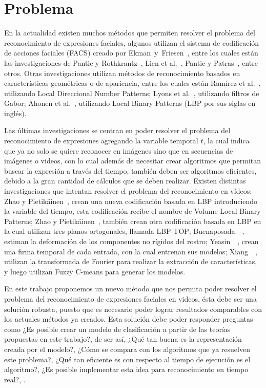 \section{Problema}
\label{sec:problema}

En la actualidad existen muchos métodos que permiten resolver el problema del reconocimiento de expresiones faciales, algunos utilizan el sistema de codificación de acciones faciales (FACS) creado por Ekman~y~Friesen~\cite{Ekman1978}, entre los cuales están las investigaciones de Pantic y Rothkrantz~\cite{Pantic2004}, Lien et al.~\cite{Lien1998}, Pantic y Patras~\cite{Pantic2006}, entre otros. Otras investigaciones utilizan métodos de reconocimiento basados en características geométricas o de apariencia, entre los cuales están Ramírez et al.~\cite{RamirezRivera2013}, utilizando Local Direccional Number Patterns; Lyons et al.~\cite{Lyons1998}, utilizando filtros de Gabor; Ahonen et al.~\cite{Ahonen2006}, utilizando Local Binary Patterns (LBP por sus siglas en inglés).

Las últimas investigaciones se centran en poder resolver el problema del reconocimiento de expresiones agregando la variable temporal $t$, la cual indica que ya no solo se quiere reconocer en imágenes sino que en secuencias de imágenes o videos, con lo cual además de necesitar crear algoritmos que permitan buscar la expresión a través del tiempo, también deben ser algoritmos eficientes, debido a la gran cantidad de cálculos que se deben realizar. Existen distintas investigaciones que intentan resolver el problema del reconocimiento en vídeos: Zhao y Pietikäinen~\cite{Zhao2006}, crean una nueva codificación basada en LBP introduciendo la variable del tiempo, esta codificación recibe el nombre de Volume Local Binary Patterns; Zhao y Pietikäinen~\cite{Zhao2006}, también crean otra codificación basada en LBP en la cual utilizan tres planos ortogonales, llamada LBP-TOP; Buenaposada~\etal~\cite{Buenaposada2008}, estiman la deformación de los componentes no rígidos del rostro; Yeasin~\etal~\cite{Yeasin2004}, crean una firma temporal de cada entrada, con la cual entrenan sus modelos; Xiang~\etal~\cite{Xiang2008}, utilizan la transformada de Fourier para realizar la extracción de características, y luego utilizan Fuzzy C-means para generar los modelos.

En este trabajo proponemos un nuevo método que nos permita poder resolver el problema del reconocimiento de expresiones faciales en videos, ésta debe ser una solución robusta, puesto que es necesario poder lograr resultados comparables con los actuales métodos ya creados. Esta solución debe poder responder preguntas como ¿Es posible crear un modelo de clasificación a partir de las teorías propuestas en este trabajo?, de ser así, ¿Qué tan buena es la representación creada por el modelo?, ¿Cómo se compara con los algoritmos que ya resuelven este problema?, ¿Qué tan eficiente es con respecto al tiempo de ejecución es el algoritmo?, ¿Es posible implementar esta idea para reconocimiento en tiempo real?, \etc.



